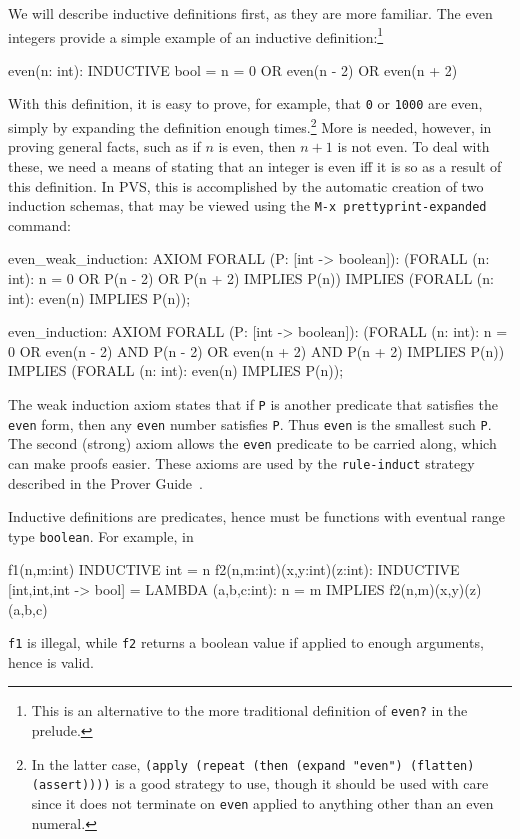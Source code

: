 We will describe inductive definitions first, as they are more familiar.
The even integers provide a simple example of an inductive
definition:\footnote{This is an alternative to the more traditional
definition of \texttt{even?} in the prelude.}
\begin{pvsex}
  even(n: int): INDUCTIVE bool = n = 0 OR even(n - 2) OR even(n + 2)
\end{pvsex}
With this definition, it is easy to prove, for example, that \texttt{0} or
\texttt{1000} are even, simply by expanding the definition enough
times.\footnote{In the latter case, \texttt{(apply (repeat (then (expand
"even") (flatten) (assert))))} is a good strategy to use, though it should
be used with care since it does not terminate on \texttt{even} applied to
anything other than an even numeral.}  More is needed, however, in proving
general facts, such as if $n$ is even, then $n+1$ is not even.  To deal
with these, we need a means of stating that an integer is even iff it is
so as a result of this definition.  In PVS, this is accomplished by the
automatic creation of two induction schemas, that may be viewed using the
\texttt{M-x~prettyprint-expanded} command:
\begin{session}
  even_weak_induction: AXIOM
    FORALL (P: [int -> boolean]):
      (FORALL (n: int): n = 0 OR P(n - 2) OR P(n + 2) IMPLIES P(n)) IMPLIES
       (FORALL (n: int): even(n) IMPLIES P(n));

  even_induction: AXIOM
    FORALL (P: [int -> boolean]):
      (FORALL (n: int):
         n = 0 OR even(n - 2) AND P(n - 2) OR even(n + 2) AND P(n + 2)
          IMPLIES P(n))
       IMPLIES (FORALL (n: int): even(n) IMPLIES P(n));
\end{session}
The weak induction axiom states that if \texttt{P} is another predicate
that satisfies the \texttt{even} form, then any \texttt{even} number
satisfies \texttt{P}.  Thus \texttt{even} is the smallest such \texttt{P}.
The second (strong) axiom allows the \texttt{even} predicate to be carried
along, which can make proofs easier.  These axioms are used by the
\texttt{rule-induct} strategy described in the Prover
Guide~\cite{PVS:prover}.

Inductive definitions are predicates, hence must be functions with
eventual range type \texttt{boolean}.  For example, in
\begin{session}
  f1(n,m:int) INDUCTIVE int = n
  f2(n,m:int)(x,y:int)(z:int): INDUCTIVE [int,int,int -> bool] =
      LAMBDA (a,b,c:int): n = m IMPLIES f2(n,m)(x,y)(z)(a,b,c)
\end{session}
\texttt{f1} is illegal, while \texttt{f2} returns a boolean value if
applied to enough arguments, hence is valid.


